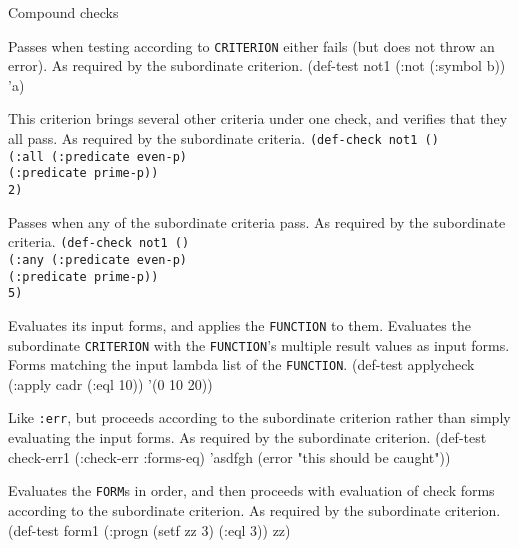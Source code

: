 \begin{criteriaGroup}{Compound checks}{}

{Passes when testing according to \texttt{CRITERION} either fails (but
does not throw an error).}
{As required by the subordinate criterion.}
{\noExpl}
{\singleEx}{(def-test not1 (:not (:symbol b)) 'a)}

{This criterion brings several other criteria under one check, and
verifies that they all pass.}
{As required by the subordinate criteria.}
{\noExpl}
{\tabbingEx}{\texttt{(de}\=\texttt{f-}\=\texttt{check not1 ()}
\\ \>\>\texttt{(:all }\=\texttt{(:predicate even-p)}
\\ \>\>\>\texttt{(:predicate prime-p))}
\\ \>\texttt{2)}}

{Passes when any of the subordinate criteria pass.}
{As required by the subordinate criteria.}
{\noExpl}
{\tabbingEx}{
\texttt{(de}\=\texttt{f-}\=\texttt{check not1 ()}
\\ \>\>\texttt{(:any }\=\texttt{(:predicate even-p)}
\\ \>\>\>\texttt{(:predicate prime-p))}
\\ \>\texttt{5)}}

{Evaluates its input forms, and applies the \texttt{FUNCTION} to them.
Evaluates the subordinate \texttt{CRITERION} with the
\texttt{FUNCTION}'s multiple result values as input forms.}
{Forms matching the input lambda list of the \texttt{FUNCTION}.}
{\noExpl}
{\singleEx}{(def-test applycheck (:apply cadr (:eql 10)) '(0 10 20))}

{Like \texttt{:err}, but proceeds according to the subordinate
criterion rather than simply evaluating the input forms.}
{As required by the subordinate criterion.}
{}
{\singleEx}
{(def-test check-err1 (:check-err :forms-eq) 'asdfgh (error "this should be caught"))}

{Evaluates the \texttt{FORM}s in order, and then proceeds with
evaluation of check forms according to the subordinate criterion.}
{As required by the subordinate criterion.}
{\noExpl}
{\singleEx}
{(def-test form1 (:progn (setf zz 3) (:eql 3)) zz)}


\end{criteriaGroup}
